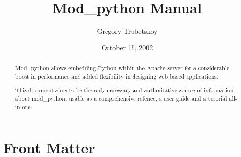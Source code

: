 \documentclass{manual}
\title{Mod\_python Manual}
\author{Gregory Trubetskoy}
\date{October 15, 2002}
\begin{document}
\maketitle

\ifhtml
\chapter*{Front Matter\label{front}}
\fi



\begin{abstract}

\noindent
Mod_python allows embedding Python within the Apache server for a considerable
boost in performance and added flexibility in designing web based
applications.

This document aims to be the only necessary and authoritative source of
information about mod_python, usable as a comprehensive refence, a user guide
and a tutorial all-in-one.

\begin{seealso}
\end{seealso}

\end{abstract}

\tableofcontents

\appendix


\end{document}
